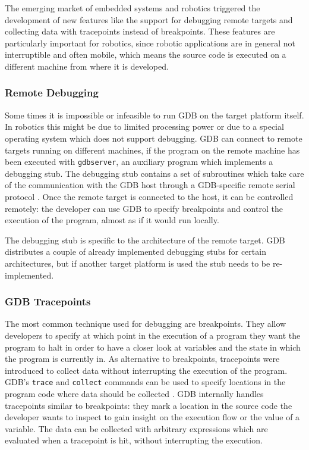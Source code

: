 The emerging market of embedded systems and robotics triggered the development of new features like the support for debugging remote targets and collecting data with tracepoints instead of breakpoints. These features are particularly important for robotics, since robotic applications are in general not interruptible and often mobile, which means the source code is executed on a different machine from where it is developed.

\subsubsection{Remote Debugging}
Some times it is impossible or infeasible to run GDB on the target platform itself. In robotics this might be due to limited processing power or due to a special operating system which does not support debugging. GDB can connect to remote targets running on different machines, if the program on the remote machine has been executed with \verb+gdbserver+, an auxiliary program which implements a debugging stub. The debugging stub contains a set of subroutines which take care of the communication with the GDB host through a GDB-specific remote serial protocol \cite{Stallman2002}. Once the remote target is connected to the host, it can be controlled remotely: the developer can use GDB to specify breakpoints and control the execution of the program, almost as if it would run locally.

The debugging stub is specific to the architecture of the remote target. GDB distributes a couple of already implemented debugging stubs for certain architectures, but if another target platform is used the stub needs to be re-implemented.

\subsubsection{GDB Tracepoints}
The most common technique used for debugging are breakpoints. They allow developers to specify at which point in the execution of a program they want the program to halt in order to have a closer look at variables and the state in which the program is currently in. As alternative to breakpoints, tracepoints were introduced to collect data without interrupting the execution of the program. GDB's \verb+trace+ and \verb+collect+ commands can be used to specify locations in the program code where data should be collected \cite{Stallman2002}. GDB internally handles tracepoints similar to breakpoints: they mark a location in the source code the developer wants to inspect to gain insight on the execution flow or the value of a variable. The data can be collected with arbitrary expressions which are evaluated when a tracepoint is hit, without interrupting the execution.

